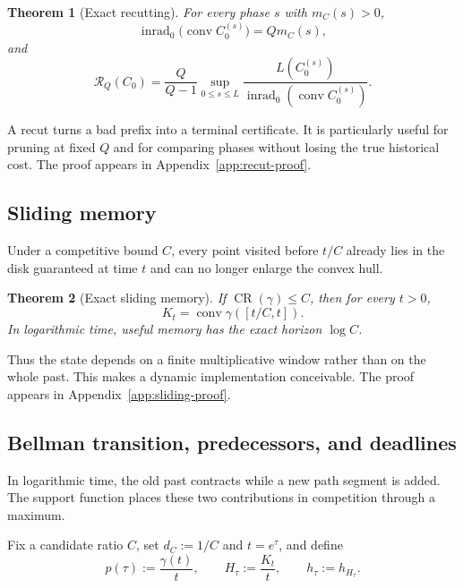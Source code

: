 \documentclass[10pt,a4paper]{article}
\newtheorem{theorem}{Theorem}[section]
\theoremstyle{definition}
\theoremstyle{remark}
\DeclareMathOperator{\conv}{conv}
\DeclareMathOperator{\inrad}{inrad}
\DeclareMathOperator{\CR}{CR}
\newcommand{\cellratio}{\mathcal{R}}
\begin{document}
\begin{theorem}[Exact recutting]
\label{thm:recut}
For every phase $s$ with $m_C(s)>0$,
\begin{equation}
\inrad_0\bigl(\conv C_0^{(s)}\bigr)=Qm_C(s),
\label{eq:recut-inradius}
\end{equation}
and
\begin{equation}
\cellratio_Q(C_0)=
\frac{Q}{Q-1}
\sup_{0\le s\le L}
\frac{L(C_0^{(s)})}{\inrad_0(\conv C_0^{(s)})}.
\label{eq:recut-functional}
\end{equation}
\end{theorem}

A recut turns a bad prefix into a terminal certificate. It is particularly useful for pruning at fixed $Q$ and for comparing phases without losing the true historical cost. The proof appears in Appendix~\ref{app:recut-proof}.

\subsection{Sliding memory}
Under a competitive bound $C$, every point visited before $t/C$ already lies in the disk guaranteed at time $t$ and can no longer enlarge the convex hull.

\begin{theorem}[Exact sliding memory]
\label{thm:sliding}
If $\CR(\gamma)\le C$, then for every $t>0$,
\begin{equation}
K_t=\conv\gamma([t/C,t]).
\label{eq:sliding-memory}
\end{equation}
In logarithmic time, useful memory has the exact horizon $\log C$.
\end{theorem}

Thus the state depends on a finite multiplicative window rather than on the whole past. This makes a dynamic implementation conceivable. The proof appears in Appendix~\ref{app:sliding-proof}.

\subsection{Bellman transition, predecessors, and deadlines}
In logarithmic time, the old past contracts while a new path segment is added. The support function places these two contributions in competition through a maximum.

Fix a candidate ratio $C$, set $d_C:=1/C$ and $t=e^\tau$, and define
\begin{equation}
p(\tau):=\frac{\gamma(t)}{t},
\qquad
H_\tau:=\frac{K_t}{t},
\qquad
h_\tau:=h_{H_\tau}.
\label{eq:normalized-bellman-state}
\end{equation}
\end{document}
